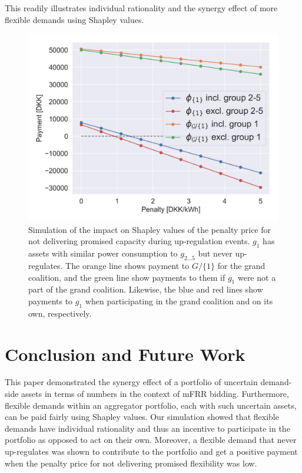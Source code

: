 \documentclass[conference]{IEEEtran}
\begin{document}
This readily illustrates individual rationality and the synergy effect of more flexible demands using Shapley values.


\begin{figure}[!t]
    \centering
    \includegraphics[width=\columnwidth]{figures/shapley_values.png}
    \caption{Simulation of the impact on Shapley values of the penalty price for not delivering promised capacity during up-regulation events. $g_1$ has assets with similar power consumption to $g_{2\hdots 5}$ but never up-regulates. The orange line shows payment to $G / \{1\}$ for the grand coalition, and the green line show payments to them if $g_1$ were not a part of the grand coalition. Likewise, the blue and red lines show payments to $g_1$ when participating in the grand coalition and on its own, respectively.}
    \label{fig:shapley_values}
\end{figure}


\section{Conclusion and Future Work}
\label{chapter4}

This paper demonstrated the synergy effect of a portfolio of uncertain demand-side assets in terms of numbers in the context of mFRR bidding. Furthermore, flexible demands within an aggregator portfolio, each with such uncertain assets, can be paid fairly using Shapley values. Our simulation showed that flexible demands have individual rationality and thus an incentive to participate in the portfolio as opposed to act on their own. Moreover, a flexible demand that never up-regulates was shown to contribute to the portfolio and get a positive payment when the penalty price for not delivering promised flexibility was low.
\end{document}
